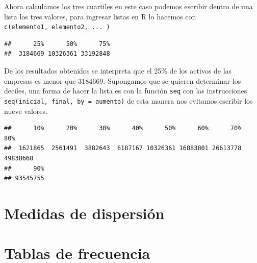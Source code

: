 \documentclass[]{book}
\newenvironment{Shaded}{\begin{snugshade}}{\end{snugshade}}
\newcommand{\KeywordTok}[1]{\textcolor[rgb]{0.13,0.29,0.53}{\textbf{#1}}}
\newcommand{\DataTypeTok}[1]{\textcolor[rgb]{0.13,0.29,0.53}{#1}}
\newcommand{\FloatTok}[1]{\textcolor[rgb]{0.00,0.00,0.81}{#1}}
\newcommand{\OperatorTok}[1]{\textcolor[rgb]{0.81,0.36,0.00}{\textbf{#1}}}
\newcommand{\NormalTok}[1]{#1}
\begin{document}
Ahora calculamos los tres cuartiles en este caso podemos escribir dentro
de una lista los tres valores, para ingresar listas en R lo hacemos con
\texttt{c(elemento1,\ elemento2,\ ...\ )}

\begin{Shaded}
\end{Shaded}

\begin{verbatim}
##      25%      50%      75% 
##  3184669 10326361 33192848
\end{verbatim}

De los resultados obtenidos se interpreta que el 25\% de los activos de
las empresas es menor que \(3 184 669\). Supongamos que se quieren
determinar los deciles, una forma de hacer la lista es con la función
\texttt{seq} con las instrucciones
\texttt{seq(inicial,\ final,\ by\ =\ aumento)} de esta manera nos
evitamos escribir los nueve valores.

\begin{Shaded}
\end{Shaded}

\begin{verbatim}
##      10%      20%      30%      40%      50%      60%      70%      80% 
##  1621865  2561491  3882643  6187167 10326361 16883801 26613778 49838668 
##      90% 
## 93545755
\end{verbatim}

\section{Medidas de dispersión}\label{medidas-de-dispersion}

\section{Tablas de frecuencia}\label{tablas-de-frecuencia}
\end{document}

